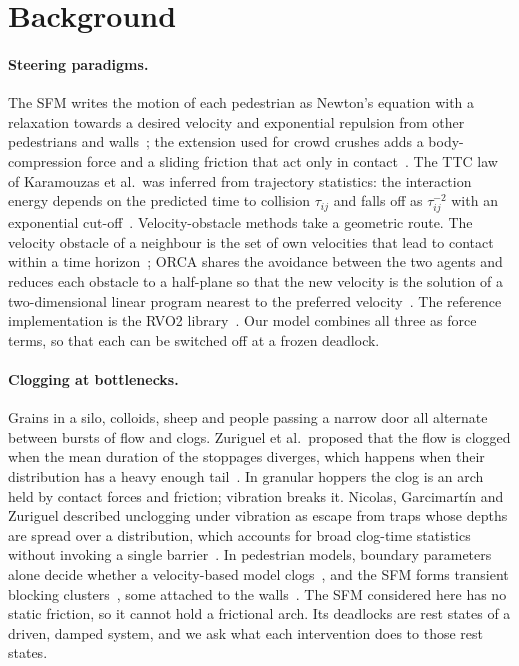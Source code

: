 \section{Background}\label{sec:background}
\paragraph{Steering paradigms.}
The SFM writes the motion of each pedestrian as Newton's equation with a relaxation towards a desired velocity and exponential repulsion from other pedestrians and walls~\cite{helbing1995}; the extension used for crowd crushes adds a body-compression force and a sliding friction that act only in contact~\cite{helbing2000nature}. The TTC law of Karamouzas et al.\ was inferred from trajectory statistics: the interaction energy depends on the predicted time to collision $\tau_{ij}$ and falls off as $\tau_{ij}^{-2}$ with an exponential cut-off~\cite{karamouzas2014}. Velocity-obstacle methods take a geometric route. The velocity obstacle of a neighbour is the set of own velocities that lead to contact within a time horizon~\cite{fiorini1998}; ORCA shares the avoidance between the two agents and reduces each obstacle to a half-plane so that the new velocity is the solution of a two-dimensional linear program nearest to the preferred velocity~\cite{vandenberg2011}. The reference implementation is the RVO2 library~\cite{vandenberg2011rvo2}. Our model combines all three as force terms, so that each can be switched off at a frozen deadlock.

\paragraph{Clogging at bottlenecks.}
Grains in a silo, colloids, sheep and people passing a narrow door all alternate between bursts of flow and clogs. Zuriguel et al.\ proposed that the flow is clogged when the mean duration of the stoppages diverges, which happens when their distribution has a heavy enough tail~\cite{zuriguel2014}. In granular hoppers the clog is an arch held by contact forces and friction; vibration breaks it. Nicolas, Garcimart\'in and Zuriguel described unclogging under vibration as escape from traps whose depths are spread over a distribution, which accounts for broad clog-time statistics without invoking a single barrier~\cite{nicolas2018trap}. In pedestrian models, boundary parameters alone decide whether a velocity-based model clogs~\cite{xu2021}, and the SFM forms transient blocking clusters~\cite{parisi2005microscopic}, some attached to the walls~\cite{cornes2021microscopic}. The SFM considered here has no static friction, so it cannot hold a frictional arch. Its deadlocks are rest states of a driven, damped system, and we ask what each intervention does to those rest states.

